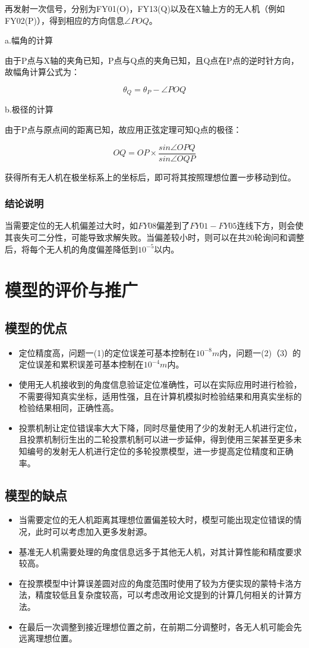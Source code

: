 \documentclass{ctexart}
\begin{document}
再发射一次信号，分别为FY01(O)，FY13(Q)以及在X轴上方的无人机（例如FY02(P)），得到相应的方向信息$\angle POQ$。

a.幅角的计算

由于P点与X轴的夹角已知，P点与Q点的夹角已知，且Q点在P点的逆时针方向，故幅角计算公式为：

\begin{equation}
  \theta_Q=\theta_P-\angle POQ
\end{equation}

b.极径的计算

由于P点与原点间的距离已知，故应用正弦定理可知Q点的极径：

\[
  OQ=OP\times \frac{sin \angle OPQ}{sin\angle OQP}
\]

获得所有无人机在极坐标系上的坐标后，即可将其按照理想位置一步移动到位。

\subsubsection{结论说明}

当需要定位的无人机偏差过大时，如$FY08$偏差到了$FY01-FY05$连线下方，则会使其丧失可二分性，可能导致求解失败。当偏差较小时，则可以在共$20$轮询问和调整后，将每个无人机的角度偏差降低到$10^{-5}$以内。

\section{模型的评价与推广}
\subsection{模型的优点}
    \begin{itemize}
      \item 定位精度高，问题一(1)的定位误差可基本控制在$10^{-8}m$内，问题一(2)（3）的定位误差和累积误差可基本控制在$10^{-4}m$内。
      \item 使用无人机接收到的角度信息验证定位准确性，可以在实际应用时进行检验，不需要得知真实坐标，适用性强，且在计算机模拟时检验结果和用真实坐标的检验结果相同，正确性高。
      \item 投票机制让定位错误率大大下降，同时尽量使用了少的发射无人机进行定位，且投票机制衍生出的二轮投票机制可以进一步延伸，得到使用三架甚至更多未知编号的发射无人机进行定位的多轮投票模型，进一步提高定位精度和正确率。
    \end{itemize}
\subsection{模型的缺点}
    \begin{itemize}
      \item 当需要定位的无人机距离其理想位置偏差较大时，模型可能出现定位错误的情况，此时可以考虑加入更多发射源。
      \item 基准无人机需要处理的角度信息远多于其他无人机，对其计算性能和精度要求较高。
      \item 在投票模型中计算误差圆对应的角度范围时使用了较为方便实现的蒙特卡洛方法，精度较低且复杂度较高，可以考虑改用论文提到的计算几何相关的计算方法。
      \item 在最后一次调整到接近理想位置之前，在前期二分调整时，各无人机可能会先远离理想位置。
    \end{itemize}
\end{document}
